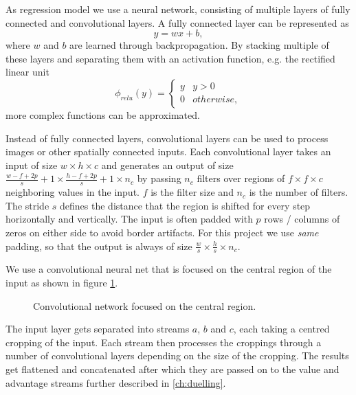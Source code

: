 
As regression model we use a neural network, consisting of multiple layers of fully connected and convolutional layers. A fully connected layer can be represented as
\begin{equation}
y = w x+b,
\end{equation}
where $w$ and $b$ are learned through backpropagation. By stacking multiple of these layers and separating them with an activation function, e.g. the rectified linear unit
\begin{equation}
\phi_{relu}(y) = \begin{cases}
y & y > 0 \\
0 & otherwise,
\end{cases}
\end{equation}
more complex functions can be approximated.

Instead of fully connected layers, convolutional layers can be used to process images or other spatially connected inputs. Each convolutional layer takes an input of size $w\times h \times c$ and generates an output of size $\frac{w-f+2p}{s}+1 \times \frac{h-f+2p}{s}+1 \times n_c$ by passing $n_c$ filters over regions of $f\times f \times c$ neighboring values in the input. $f$ is the filter size and $n_c$ is the number of filters. The stride $s$ defines the distance that the region is shifted for every step horizontally and vertically. The input is often padded with $p$ rows / columns of zeros on either side to avoid border artifacts. For this project we use \emph{same} padding, so that the output is always of size $\frac{w}{s}\times \frac{h}{s} \times n_c$.

We use a convolutional neural net that is focused on the central region of the input as shown in figure \ref{fig:centre-net}.
\begin{figure}
  \centering
  
  \caption{Convolutional network focused on the central region.}
  \label{fig:centre-net}
\end{figure}
The input layer gets separated into streams $a$, $b$ and $c$, each taking a centred cropping of the input. Each stream then processes the croppings through a number of convolutional layers depending on the size of the cropping. The results get flattened and concatenated after which they are passed on to the value and advantage streams further described in \ref{ch:duelling}.
